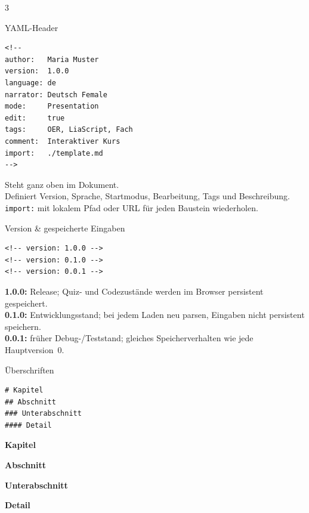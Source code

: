 \documentclass[a4paper,landscape,9pt]{extarticle}
\newcommand{\prevsm}[1]{{\footnotesize\color{muted} #1}}
\begin{document}
\begingroup
{}
\begin{multicols}{3}


\begin{mdcard}{YAML-Header}
\begin{lstlisting}[language=lia,basicstyle=\ttfamily\tiny]
<!--
author:   Maria Muster
version:  1.0.0
language: de
narrator: Deutsch Female
mode:     Presentation
edit:     true
tags:     OER, LiaScript, Fach
comment:  Interaktiver Kurs
import:   ./template.md
-->
\end{lstlisting}
\tcblower
\prevsm{Steht ganz oben im Dokument.\\
Definiert Version, Sprache, Startmodus,
Bearbeitung, Tags und Beschreibung.\\[2pt]
{\footnotesize \texttt{import:} mit lokalem Pfad oder URL für jeden Baustein wiederholen.}}
\end{mdcard}

\begin{mdcard}{Version \& gespeicherte Eingaben}
\begin{lstlisting}[language=lia]
<!-- version: 1.0.0 -->
<!-- version: 0.1.0 -->
<!-- version: 0.0.1 -->
\end{lstlisting}
\tcblower
\prevsm{\textbf{1.0.0:} Release; Quiz- und Codezustände werden im Browser persistent gespeichert.\\[2pt]
\textbf{0.1.0:} Entwicklungsstand; bei jedem Laden neu parsen, Eingaben nicht persistent speichern.\\[2pt]
\textbf{0.0.1:} früher Debug-/Teststand; gleiches Speicherverhalten wie jede Hauptversion~0.}
\end{mdcard}

\begin{mdcard}{Überschriften}
\begin{lstlisting}[language=lia]
# Kapitel
## Abschnitt
### Unterabschnitt
#### Detail
\end{lstlisting}
\tcblower
{\large\bfseries Kapitel}\par\vspace{1pt}
{\normalsize\bfseries Abschnitt}\par\vspace{1pt}
{\small\bfseries Unterabschnitt}\par\vspace{1pt}
{\footnotesize\bfseries Detail}
\end{mdcard}


\end{multicols}
\end{document}
